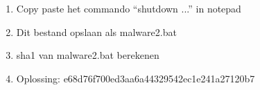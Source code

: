 \begin{enumerate}
  \item Copy paste het commando ``shutdown ...'' in notepad
  \item Dit bestand opslaan als malware2.bat
  \item sha1 van malware2.bat berekenen
  \item Oplossing: e68d76f700ed3aa6a44329542ec1e241a27120b7
\end{enumerate}